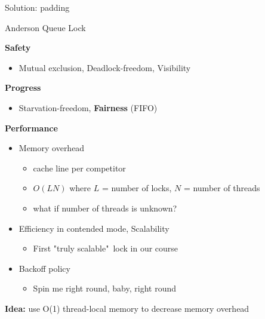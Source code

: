 \begin{frame}{Solution: padding}
\end{frame}

\begin{frame}{Anderson Queue Lock}

\textbf{Safety}
\begin{itemize}
  \item Mutual exclusion, Deadlock-freedom, Visibility
\end{itemize}

\textbf{Progress}
\begin{itemize}
  \item Starvation-freedom, \textbf{Fairness} (FIFO)
\end{itemize}

\textbf{Performance}
\begin{itemize}
  \item Memory overhead
  \begin{itemize}    
    \item cache line per competitor
    \item $O(LN)$ where $L$ = number of locks, $N$ = number of threads
    \item what if number of threads is unknown?   
  \end{itemize}
  \item Efficiency in contended mode, Scalability
  \begin{itemize}
    \item First "truly scalable"\ lock in our course
  \end{itemize}  
  \item Backoff policy  
  \begin{itemize}
    \item Spin me right round, baby, right round
  \end{itemize}  
\end{itemize}

\pause
\textbf{Idea:} use O(1) thread-local memory to decrease memory overhead

\end{frame}


